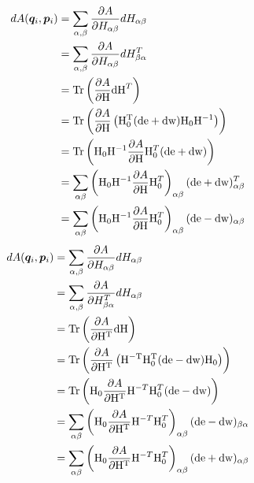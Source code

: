 \documentclass[11pt,a4paper,uplatex]{jsarticle}
\begin{document}
\begin{align}
    dA({\bm{q}_{i},\bm{p}_{i}}) &= \sum_{\alpha,\beta} \frac{\partial A}{\partial H_{\alpha \beta}} dH_{\alpha \beta} \\
    &= \sum_{\alpha,\beta} \frac{\partial A}{\partial H_{\alpha \beta}} dH_{\beta \alpha}^{T} \\
    &= \mathrm{Tr} \left(\frac{\partial A}{\partial {\rm H}} {\rm dH}^{T} \right) \\
    &= \mathrm{Tr} \left(\frac{\partial A}{\partial {\rm H}} \left(  {\rm H_{0}^{T}}({\rm de + dw}) {\rm H_{0}} {\rm H}^{-1} \right) \right) \\
    &= \mathrm{Tr} \left({\rm H}_{0} {\rm H}^{-1} \frac{\partial A}{\partial {\rm H}} {\rm H}_{0}^{T} ({\rm de + dw}) \right) \\
    &= \sum_{\alpha \beta} \left({\rm H}_{0} {\rm H}^{-1} \frac{\partial A}{\partial {\rm H}} {\rm H}_{0}^{T} \right)_{\alpha \beta} ({\rm de + dw})^{T}_{\alpha \beta}\\
    &= \sum_{\alpha \beta} \left({\rm H}_{0} {\rm H}^{-1} \frac{\partial A}{\partial {\rm H}} {\rm H}_{0}^{T} \right)_{\alpha \beta} ({\rm de - dw})_{\alpha \beta}\\
\end{align}
\begin{align}
    dA({\bm{q}_{i},\bm{p}_{i}}) &= \sum_{\alpha,\beta} \frac{\partial A}{\partial H_{\alpha \beta}} dH_{\alpha \beta} \\
    &= \sum_{\alpha,\beta} \frac{\partial A}{\partial H_{\beta \alpha}^{T}} dH_{\alpha \beta} \\
    &= \mathrm{Tr} \left(\frac{\partial A}{\partial {\rm H^{T}}} {\rm dH} \right) \\
    &= \mathrm{Tr} \left(\frac{\partial A}{\partial {\rm H^{T}}} \left(  {\rm H^{-T} H_{0}^{T}} ({\rm de - dw}) {\rm H_{0}} \right) \right) \\
    &= \mathrm{Tr} \left({\rm H}_{0} \frac{\partial A}{\partial {\rm H^{T}}} {\rm H}^{-T}{\rm H}_{0}^{T} ({\rm de - dw}) \right) \\
    &= \sum_{\alpha \beta}\left({\rm H}_{0} \frac{\partial A}{\partial {\rm H^{T}}} {\rm H}^{-T}{\rm H}_{0}^{T}\right)_{\alpha \beta} ({\rm de - dw})_{\beta \alpha} \\
    &= \sum_{\alpha \beta}\left({\rm H}_{0} \frac{\partial A}{\partial {\rm H^{T}}} {\rm H}^{-T}{\rm H}_{0}^{T}\right)_{\alpha \beta} ({\rm de + dw})_{\alpha \beta} \\
\end{align}
\end{document}
